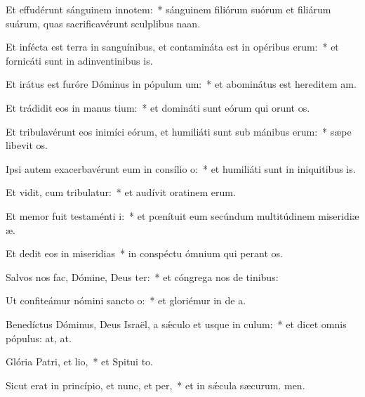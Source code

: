 \item Et effudérunt sánguinem innotem:~* sánguinem filiórum suórum et filiárum suárum, quas sacrificavérunt sculplibus naan.
\item Et infécta est terra in sanguínibus, et contamináta est in opéribus erum:~* et fornicáti sunt in adinventinibus is.
\item Et irátus est furóre Dóminus in pópulum um:~* et abominátus est hereditem am.
\item Et trádidit eos in manus tium:~* et domináti sunt eórum qui orunt os.
\item Et tribulavérunt eos inimíci eórum, et humiliáti sunt sub mánibus erum:~* sæpe libevit os.
\item Ipsi autem exacerbavérunt eum in consílio o:~* et humiliáti sunt in iniquitibus is.
\item Et vidit, cum tribulatur:~* et audívit oratinem erum.
\item Et memor fuit testaménti i:~* et pœnítuit eum secúndum multitúdinem miseridiæ æ.
\item Et dedit eos in miseridias~* in conspéctu ómnium qui perant os.
\item Salvos nos fac, Dómine, Deus ter:~* et cóngrega nos de tinibus:
\item Ut confiteámur nómini sancto o:~* et gloriémur in de a.
\item Benedíctus Dóminus, Deus Israël, a sǽculo et usque in culum:~* et dicet omnis pópulus: at, at.
\item Glória Patri, et lio,~* et Spitui to.
\item Sicut erat in princípio, et nunc, et per,~* et in sǽcula sæcurum. men.

